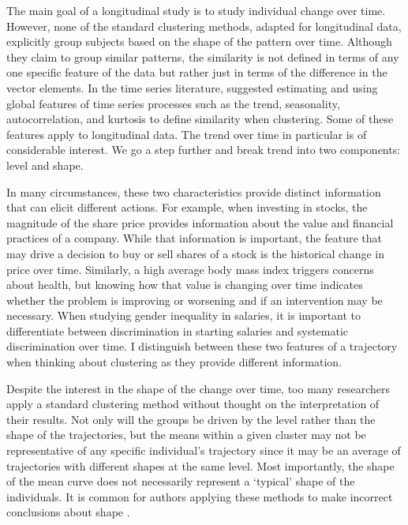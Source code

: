 The main goal of a longitudinal study is to study individual change over time. However, none of the standard clustering methods, adapted for longitudinal data, explicitly group subjects based on the shape of the pattern over time. Although they claim to group similar patterns, the similarity is not defined in terms of any one specific feature of the data but rather just in terms of the difference in the vector elements. In the time series literature, \textcite{wang2006} suggested estimating and using global features of time series processes such as the trend, seasonality, autocorrelation, and kurtosis to define similarity when clustering. Some of these features apply to longitudinal data. The trend over time in particular is of considerable interest. We go a step further and break trend into two components: level and shape. 

In many circumstances, these two characteristics provide distinct information that can elicit different actions. For example, when investing in stocks, the magnitude of the share price provides information about the value and financial practices of a company. While that information is important, the feature that may drive a decision to buy or sell shares of a stock is the historical change in price over time. Similarly, a high average body mass index triggers concerns about health, but knowing how that value is changing over time indicates whether the problem is improving or worsening and if an intervention may be necessary. When studying gender inequality in salaries, it is important to differentiate between discrimination in starting salaries  and systematic discrimination over time. I distinguish between these two features of a trajectory when thinking about clustering as they provide different information.  

Despite the interest in the shape of the change over time, too many researchers apply a standard clustering method without  thought on the interpretation of their results. Not only will the groups be driven by the level rather than the shape of the trajectories, but the means within a given cluster may not be representative of any specific individual's trajectory since it may be an average of trajectories with different shapes at the same level. Most importantly, the shape of the mean curve does not necessarily represent a `typical' shape of the individuals. It is common for authors applying these methods to make incorrect conclusions about shape \cite{windle2004,mulvaney2006,broadbent2008,pryor2011,mccoy2010}. 


